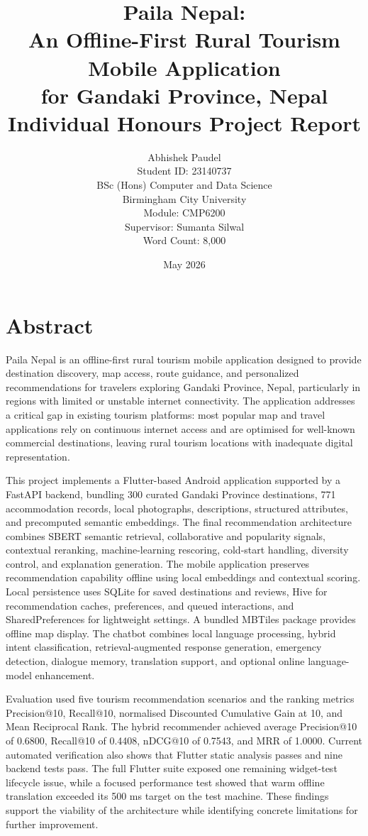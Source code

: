 \documentclass[12pt,a4paper,oneside]{report}
\title{\textbf{Paila Nepal:\\An Offline-First Rural Tourism Mobile Application\\for Gandaki Province, Nepal}\\[1.2cm]\large Individual Honours Project Report}
\author{Abhishek Paudel \\ Student ID: 23140737 \\[0.8cm] BSc (Hons) Computer and Data Science \\ Birmingham City University \\[0.8cm] Module: CMP6200 \\ Supervisor: Sumanta Silwal \\ Word Count: 8,000}
\date{May 2026}
\begin{document}
\hypersetup{pageanchor=false}
\maketitle
\hypersetup{pageanchor=true}

\newpage
\chapter*{Abstract}

Paila Nepal is an offline-first rural tourism mobile application designed to provide destination discovery, map access, route guidance, and personalized recommendations for travelers exploring Gandaki Province, Nepal, particularly in regions with limited or unstable internet connectivity. The application addresses a critical gap in existing tourism platforms: most popular map and travel applications rely on continuous internet access and are optimised for well-known commercial destinations, leaving rural tourism locations with inadequate digital representation.

This project implements a Flutter-based Android application supported by a FastAPI backend, bundling 300 curated Gandaki Province destinations, 771 accommodation records, local photographs, descriptions, structured attributes, and precomputed semantic embeddings. The final recommendation architecture combines SBERT semantic retrieval, collaborative and popularity signals, contextual reranking, machine-learning rescoring, cold-start handling, diversity control, and explanation generation. The mobile application preserves recommendation capability offline using local embeddings and contextual scoring. Local persistence uses SQLite for saved destinations and reviews, Hive for recommendation caches, preferences, and queued interactions, and SharedPreferences for lightweight settings. A bundled MBTiles package provides offline map display. The chatbot combines local language processing, hybrid intent classification, retrieval-augmented response generation, emergency detection, dialogue memory, translation support, and optional online language-model enhancement.

Evaluation used five tourism recommendation scenarios and the ranking metrics Precision@10, Recall@10, normalised Discounted Cumulative Gain at 10, and Mean Reciprocal Rank. The hybrid recommender achieved average Precision@10 of 0.6800, Recall@10 of 0.4408, nDCG@10 of 0.7543, and MRR of 1.0000. Current automated verification also shows that Flutter static analysis passes and nine backend tests pass. The full Flutter suite exposed one remaining widget-test lifecycle issue, while a focused performance test showed that warm offline translation exceeded its 500 ms target on the test machine. These findings support the viability of the architecture while identifying concrete limitations for further improvement.
\end{document}
